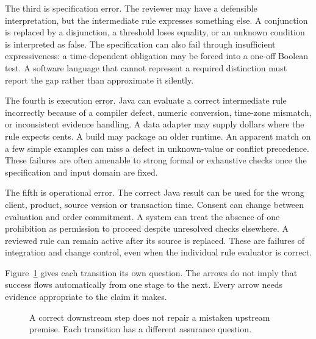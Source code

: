 \documentclass[12pt,a4paper,oneside,openany]{book}
\begin{document}
The third is specification error. The reviewer may have a defensible
interpretation, but the intermediate rule expresses something else. A conjunction
is replaced by a disjunction, a threshold loses equality, or an unknown condition
is interpreted as false. The specification can also fail through insufficient
expressiveness: a time-dependent obligation may be forced into a one-off Boolean
test. A software language that cannot represent a required distinction must
report the gap rather than approximate it silently.

The fourth is execution error. Java can evaluate a correct intermediate rule
incorrectly because of a compiler defect, numeric conversion, time-zone mismatch,
or inconsistent evidence handling. A data adapter may supply dollars where the
rule expects cents. A build may package an older runtime. An apparent match on a
few simple examples can miss a defect in unknown-value or conflict precedence.
These failures are often amenable to strong formal or exhaustive checks once
the specification and input domain are fixed.

The fifth is operational error. The correct Java result can be used for the
wrong client, product, source version or transaction time. Consent can change
between evaluation and order commitment. A system can treat the absence of one
prohibition as permission to proceed despite unresolved checks elsewhere. A
reviewed rule can remain active after its source is replaced. These are failures
of integration and change control, even when the individual rule evaluator is
correct.

Figure~\ref{fig:assurance-chain} gives each transition its own question. The
arrows do not imply that success flows automatically from one stage to the next. Every
arrow needs evidence appropriate to the claim it makes.

\begin{figure}[htbp]
\centering
{}
\caption{A correct downstream step does not repair a mistaken upstream premise.
Each transition has a different assurance question.}
\label{fig:assurance-chain}
\end{figure}
\end{document}
